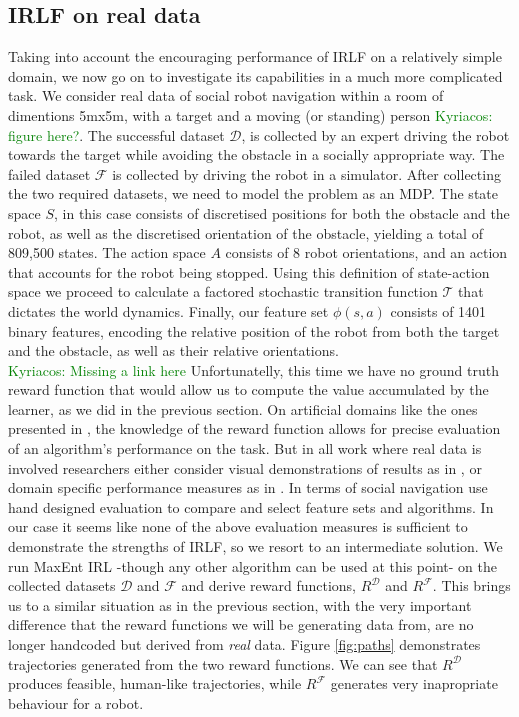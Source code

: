 \documentclass[letterpaper]{article}
\newcommand{\ks}[1]{\textcolor{green}{Kyriacos: #1}}
\newcommand{\ks}[1]{}
\begin{document}
\subsection{IRLF on real data}
Taking into account the encouraging performance of IRLF on a relatively simple domain, we now go on to investigate its capabilities in a much more complicated task. We consider real data
of social robot navigation within a room of dimentions 5mx5m, with a target and a moving (or standing) person \ks{figure here?}. The successful dataset $\mathcal{D}$, is collected by an expert driving the robot towards the target while avoiding the obstacle in a socially appropriate way. The failed dataset $\mathcal{F}$ is collected by driving the robot in a simulator. After collecting the two required datasets, we need to model the problem as an MDP. The state space $S$, in this case consists of discretised positions for both the obstacle and the robot, as well as the discretised orientation of the obstacle, yielding a total of 809,500 states. The action space $A$ consists of 8 robot orientations, and an action that accounts for the robot being stopped. Using this definition of state-action space we proceed to calculate a factored stochastic transition function $\mathcal{T}$ that dictates the world dynamics. Finally, our feature set $\phi(s,a)$ consists of 1401 binary features, encoding the relative position of the robot from both the target and the obstacle, as well as their relative orientations. \\
\ks{Missing a link here}
Unfortunatelly, this time we have no ground truth reward function that would allow us to compute the value accumulated by the learner, as we did in the previous section. On artificial domains like the ones presented in \cite{levine2011nonlinear}, the knowledge of the reward function allows for precise evaluation of an algorithm's performance on the task. But in all work where real data is involved researchers either consider visual demonstrations of results as in \cite{ratliff2006maximum}, or domain specific performance measures as in \cite{neu2009training}. In terms of social navigation \cite{vasquez2014inverse} use hand designed evaluation to compare and select feature sets and algorithms. In our case it seems like none of the above evaluation measures is sufficient to demonstrate the strengths of IRLF, so we resort to an intermediate solution. We run MaxEnt IRL -though any other algorithm can be used at this point- on the collected datasets $\mathcal{D}$ and $\mathcal{F}$ and derive reward functions, $R^{\mathcal{D}}$ and $R^{\mathcal{F}}$. This brings us to a similar situation as in the previous section, with the very important difference that the reward functions we will be generating data from, are no longer handcoded but derived from \emph{real} data. Figure \ref{fig:paths} demonstrates trajectories generated from the two reward functions. We can see that $R^{\mathcal{D}}$ produces feasible, human-like trajectories, while $R^{\mathcal{F}}$ generates very inapropriate behaviour for a robot.\\
\end{document}
